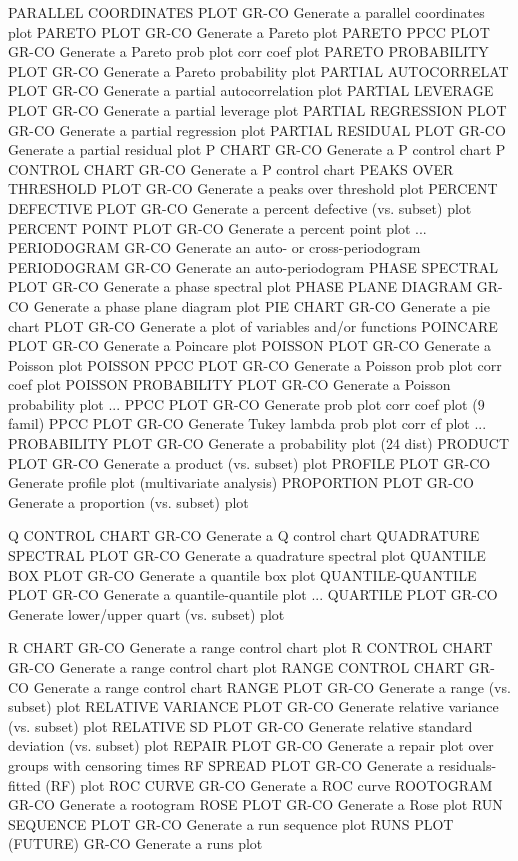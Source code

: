 PARALLEL COORDINATES PLOT   GR-CO Generate a parallel coordinates plot
PARETO PLOT                 GR-CO Generate a Pareto plot
PARETO PPCC PLOT            GR-CO Generate a Pareto prob plot corr coef plot
PARETO PROBABILITY PLOT     GR-CO Generate a Pareto probability plot
PARTIAL AUTOCORRELAT PLOT   GR-CO Generate a partial autocorrelation plot
PARTIAL LEVERAGE PLOT       GR-CO Generate a partial leverage plot
PARTIAL REGRESSION PLOT     GR-CO Generate a partial regression plot
PARTIAL RESIDUAL PLOT       GR-CO Generate a partial residual plot
P CHART                     GR-CO Generate a P control chart
P CONTROL CHART             GR-CO Generate a P control chart
PEAKS OVER THRESHOLD PLOT   GR-CO Generate a peaks over threshold plot
PERCENT DEFECTIVE PLOT      GR-CO Generate a percent defective (vs. subset) plot
PERCENT POINT PLOT          GR-CO Generate a percent point plot
... PERIODOGRAM             GR-CO Generate an auto- or cross-periodogram
PERIODOGRAM                 GR-CO Generate an auto-periodogram
PHASE SPECTRAL PLOT         GR-CO Generate a phase spectral plot
PHASE PLANE DIAGRAM         GR-CO Generate a phase plane diagram plot
PIE CHART                   GR-CO Generate a pie chart
PLOT                        GR-CO Generate a plot of variables and/or functions
POINCARE PLOT               GR-CO Generate a Poincare plot
POISSON PLOT                GR-CO Generate a Poisson plot
POISSON PPCC PLOT           GR-CO Generate a Poisson prob plot corr coef plot
POISSON PROBABILITY PLOT    GR-CO Generate a Poisson probability plot
... PPCC PLOT               GR-CO Generate prob plot corr coef plot (9 famil)
PPCC PLOT                   GR-CO Generate Tukey lambda prob plot corr cf plot
... PROBABILITY PLOT        GR-CO Generate a probability plot (24 dist)
PRODUCT PLOT                GR-CO Generate a product (vs. subset) plot
PROFILE PLOT                GR-CO Generate profile plot (multivariate analysis)
PROPORTION PLOT             GR-CO Generate a proportion (vs. subset) plot

Q CONTROL CHART             GR-CO Generate a Q control chart
QUADRATURE SPECTRAL PLOT    GR-CO Generate a quadrature spectral plot
QUANTILE BOX PLOT           GR-CO Generate a quantile box plot
QUANTILE-QUANTILE PLOT      GR-CO Generate a quantile-quantile plot
... QUARTILE PLOT           GR-CO Generate lower/upper quart (vs. subset) plot

R CHART                     GR-CO Generate a range control chart plot
R CONTROL CHART             GR-CO Generate a range control chart plot
RANGE CONTROL CHART         GR-CO Generate a range control chart
RANGE PLOT                  GR-CO Generate a range (vs. subset) plot
RELATIVE VARIANCE PLOT      GR-CO Generate relative variance (vs. subset) plot
RELATIVE SD PLOT            GR-CO Generate relative standard deviation (vs. subset) plot
REPAIR PLOT                 GR-CO Generate a repair plot over groups with censoring times
RF SPREAD PLOT              GR-CO Generate a residuals-fitted (RF)  plot
ROC CURVE                   GR-CO Generate a ROC curve
ROOTOGRAM                   GR-CO Generate a rootogram
ROSE PLOT                   GR-CO Generate a Rose plot
RUN SEQUENCE PLOT           GR-CO Generate a run sequence plot
RUNS PLOT (FUTURE)          GR-CO Generate a runs plot

